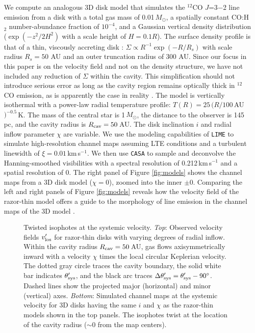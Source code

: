 We compute an analogous 3D disk model that simulates the $^{12}$CO $J$=3$-$2 
line emission from a disk with a total gas mass of 0.01\,$M_\odot$, a spatially 
constant CO:H$_2$ number-abundance fraction of $10^{-4}$, and a Gaussian 
vertical density distribution ($\exp(-z^2/2H^2)$ with a scale height of 
$H=0.1R$).  The surface density profile is that of a thin, viscously accreting 
disk \citep{lynden-bell74}: $\Sigma\propto R^{-1}\exp(-R/R_s)$ with scale 
radius $R_s=50$ AU and an outer truncation radius of 300 AU.  Since our focus 
in this paper is on the velocity field and not on the density structure, we 
have not included any reduction of $\Sigma$ within the cavity.  This 
simplification should not introduce serious error as long as the cavity region 
remains optically thick in $^{12}$CO emission, as is apparently the case in 
reality \citep{bruderer13}.  The model is vertically isothermal with a 
power-law radial temperature profile: $T(R) = 25\,(R/100$\,AU$)^{-0.5}$\,K.  
The mass of the central star is 1\,$M_\odot$, the distance to the observer is 
145\,pc, and the cavity radius is $R_{\rm cav} = 50$\,AU.  The disk inclination
$i$ and radial inflow parameter $\chi$ are variable.  We use the modeling 
capabilities of {\tt LIME} \citep{brinch10} to simulate high-resolution channel 
maps assuming LTE conditions and a turbulent linewidth of $\xi = 
0.01$\,km\,s$^{-1}$.  We then use {\tt CASA} to sample and deconvolve the 
Hanning-smoothed visibilities with a spectral resolution of 0.212\,km\,s$^{-1}$ 
and a spatial resolution of 0.  The right panel of Figure 
\ref{fig:models} shows the channel maps from a 3D disk model ($\chi=0$), zoomed 
into the inner $\pm$0.  Comparing the left and right panels of Figure 
\ref{fig:models} reveals how the velocity field of the razor-thin model offers 
a guide to the morphology of line emission in the channel maps of the 3D model 
\citep[see also][]{beckwith93}.

\begin{figure}[t!]
\caption{Twisted isophotes at the systemic velocity. {\it Top}: Observed 
velocity fields $v'_{\rm los}$ for razor-thin disks with varying degrees of 
radial inflow.  Within the cavity radius $R_{\rm cav}=50$\,AU, gas flows 
axisymmetrically inward with a velocity $\chi$ times the local circular 
Keplerian velocity.  The dotted gray circle traces the cavity boundary, the 
solid white bar indicates $\theta'_{\rm sys}$, and the black arc traces $\Delta 
\theta'_{\rm sys} = \theta'_{\rm sys} - 90^\circ$.  Dashed lines show the 
projected major (horizontal) and minor (vertical) axes.  {\it Bottom}: 
Simulated channel maps at the systemic velocity for 3D disks having the same 
$i$ and $\chi$ as the razor-thin models shown in the top panels.  The isophotes 
twist at the location of the cavity radius ($\sim$0 from the map 
centers). \label{fig:thetasys}}
\end{figure}


